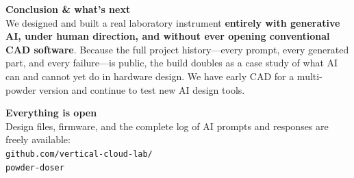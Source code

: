 \documentclass[a0,landscape]{a0poster}
\begin{document}
\vspace{10pt}

\noindent
\begin{tcolorbox}[enhanced, colback=panelbg, colframe=navy, arc=8pt,
  left=28pt, right=28pt, top=18pt, bottom=18pt, boxrule=0pt]
\Large
\begin{minipage}[t]{0.62\linewidth}
  {\LARGE\bfseries\color{navy} Conclusion \& what's next}\\[8pt]
  We designed and built a real laboratory instrument \textbf{entirely with
  generative AI, under human direction, and without ever opening
  conventional CAD software}. Because the full project history---every
  prompt, every generated part, and every failure---is public, the build
  doubles as a case study of what AI can and cannot yet do in hardware
  design. We have early CAD for a multi-powder version and continue to
  test new AI design tools.
\end{minipage}\hfill
\begin{minipage}[t]{0.33\linewidth}
  {\LARGE\bfseries\color{navy} Everything is open}\\[8pt]
  Design files, firmware, and the complete log of AI prompts and
  responses are freely available:\\[8pt]
  {\large\texttt{github.com/vertical-cloud-lab/\\powder-doser}}
\end{minipage}
\end{tcolorbox}
\end{document}
